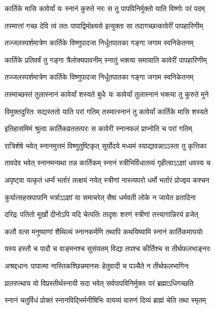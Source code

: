 \twolineshloka
{कार्तिके मासि कावेर्यां यः स्नानं कुरुते नरः}
{स तु पापविनिर्मुक्तो याति विष्णोः परं पदम्} %

\twolineshloka
{तस्मात्तां गच्छ देवि त्वं ततः पापाद्विमोक्ष्यसे}
{इत्युक्ता सा तदागच्छत्कावेरीं पापहारिणीम्} %

\twolineshloka
{तज्जलस्पर्शमात्रेण कार्तिके विष्णुपादजा}
{निर्धूतपातका गङ्गा जगाम स्वनिकेतनम्} %

\twolineshloka
{कार्तिके प्रतिवर्षं तु गङ्गा त्रैलोक्यपावनीम्}
{स्नातुं भक्त्या समायाति कावेरीं पापहारिणीम्} %

\twolineshloka
{तज्जलस्पर्शमात्रेण कार्तिके विष्णुपादजा}
{निर्धूतपातका गङ्गा जगाम स्वनिकेतनम्} %

\twolineshloka
{तस्माच्छस्तं तुलास्नानं कावेर्यां शस्यते बुधैः}
{यः कावेर्यां तुलास्नानं भक्त्या तु कुरुते मुने} %

\twolineshloka
{विमुक्तदुरितः सद्यस्ततो याति परां गतिम्}
{तस्मात्स्नानं तु कावेर्यां कार्तिके मासि शस्यते} %

\twolineshloka
{इतिहासमिमं श्रुत्वा कार्तिकव्रततत्परः}
{स कावेरी स्नानफलं प्राप्नोति च परां गतिम्} %

\twolineshloka
{रात्रिशेषे भवेत् स्नानमुत्तमं विष्णुतुष्टिकृत्}
{सूर्योदये मध्यमं स्याद्यावन्नाऽऽस्ता तु कृत्तिका} %

\twolineshloka
{तावदेव भवेत् स्नानमन्यथा तन्न कार्तिकम्}
{स्नानं स्त्रीभिर्विधातव्यं गृहीत्वाऽऽज्ञां धवस्य च} %

\twolineshloka
{अपृष्ट्वा यत्कृतं धर्म्यं भर्तारं तत्क्षयं नयेत्}
{स्त्रीणां नास्त्यपरो धर्मो भर्तारं प्रोज्झ्य कश्चन} %

\twolineshloka
{कुर्यात्सहस्रपापानि भर्त्राऽऽज्ञां या समाचरेत्}
{सैषा धर्मवती लोके न जायेत व्रतादिना} %

\twolineshloka
{दरिद्रः पतितो मूर्खो दीनोऽपि यदि चेत्पतिः}
{तादृशः शरणं स्त्रीणां तत्त्यागान्निरयं व्रजेत्} %

\twolineshloka
{कलौ वत्स मनुष्याणां शैथिल्यं स्नानकर्मणि}
{तथापि कथयिष्यामि स्नानं कार्तिकमाघयोः} %

\twolineshloka
{यस्य हस्तौ च पादौ च वाङ्मनश्च सुसंयतम्}
{विद्या तपश्च कीर्तिश्च स तीर्थफलभाङ्नरः} %

\twolineshloka
{अश्रद्दधानः पापात्मा नास्तिकश्छिन्नमानसः}
{हेतुवादी च पञ्चैते न तीर्थफलभागिनः} %

\twolineshloka
{प्रातरुत्थाय यो विप्रस्तीर्थस्नायी सदा भवेत्}
{सर्वपापविनिर्मुक्तः परं ब्रह्माऽधिगच्छति} %

\twolineshloka
{स्नानं चतुर्विधं प्रोक्तं स्नानविद्भिर्मनीषिभिः}
{वायव्यं वारुणं दिव्यं ब्राह्मं चेति तथा स्मृतम्} %

